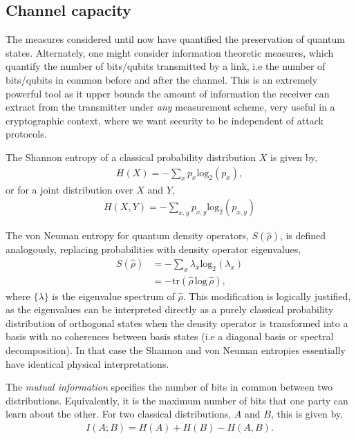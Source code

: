 \documentclass[aps,rmp,twocolumn,amsmath,amssymb,nofootinbib,superscriptaddress]{revtex4}
\begin{document}
%
%

\subsection{Channel capacity}

The measures considered until now have quantified the preservation of quantum states. Alternately, one might consider information theoretic measures, which quantify the number of bits/qubits transmitted by a link, i.e the number of bits/qubits in common before and after the channel. This is an extremely powerful tool as it upper bounds the amount of information the receiver can extract from the transmitter under \emph{any} measurement scheme, very useful in a cryptographic context, where we want security to be independent of attack protocols.

The Shannon entropy \cite{???} of a classical probability distribution $X$ is given by,
\begin{align}
H(X) = -\sum_x p_x\mathrm{log}_2(p_x),
\end{align}
or for a joint distribution over $X$ and $Y$,
\begin{align}
H(X,Y) =  -\sum_{x,y} p_{x,y}\mathrm{log}_2(p_{x,y})
\end{align}

The von Neuman entropy \cite{???} for quantum density operators, $S(\hat\rho)$, is defined analogously, replacing probabilities with density operator eigenvalues,
\begin{align}
S(\hat\rho) &= - \sum_x \lambda_x \mathrm{log}_2 (\lambda_x) \nonumber \\
&= -\mathrm{tr}(\hat\rho\,\mathrm{log}\,\hat\rho),
\end{align}
where $\{\lambda\}$ is the eigenvalue spectrum of $\hat\rho$. This modification is logically justified, as the eigenvalues can be interpreted directly as a purely classical probability distribution of orthogonal states when the density operator is transformed into a basis with no coherences between basis states (i.e a diagonal basis or spectral decomposition). In that case the Shannon and von Neuman entropies essentially have identical physical interpretations.

The \emph{mutual information} specifies the number of bits in common between two distributions. Equivalently, it is the maximum number of bits that one party can learn about the other. For two classical distributions, $A$ and $B$, this is given by,
\begin{align}
I(A;B) = H(A) + H(B) - H(A,B).
\end{align}
\end{document}

